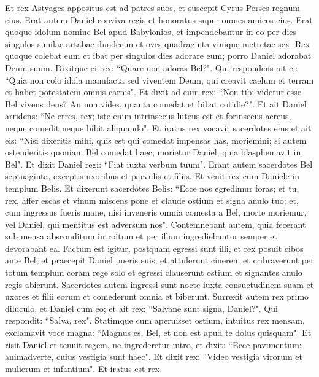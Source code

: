 \begin{biblechapter}  
\verse Et rex Astyages appositus est ad patres suos, et suscepit Cyrus Perses regnum eius. 
\verse Erat autem Daniel conviva regis et honoratus super omnes amicos eius. 
\verse Erat quoque idolum nomine Bel apud Babylonios, ct impendebantur in eo per dies singulos similae artabae duodecim et oves quadraginta vinique metretae sex.  
\verse Rex quoque colebat eum et ibat per singulos dies adorare eum; porro Daniel adorabat Deum suum. Dixitque ei rex: “Quare non adoras Bel?". 
\verse Qui respondens ait ei: “Quia non colo idola manufacta sed viventem Deum, qui creavit caelum et terram et habet potestatem omnis carnis". 
\verse Et dixit ad eum rex: “Non tibi videtur esse Bel vivens deus? An non vides, quanta comedat et bibat cotidie?". 
\verse Et ait Daniel arridens: “Ne erres, rex; iste enim intrinsecus luteus est et forinsecus aereus, neque comedit neque bibit aliquando". 
\verse Et iratus rex vocavit sacerdotes eius et ait eis: “Nisi dixeritis mihi, quis est qui comedat impensas has, moriemini; 
\verse si autem ostenderitis quoniam Bel comedat haec, morietur Daniel, quia blasphemavit in Bel". Et dixit Daniel regi: “Fiat iuxta verbum tuum". 
\verse Erant autem sacerdotes Bel septuaginta, exceptis uxoribus et parvulis et filiis. Et venit rex cum Daniele in templum Belis. 
\verse Et dixerunt sacerdotes Belis: “Ecce nos egredimur foras; et tu, rex, affer escas et vinum miscens pone et claude ostium et signa anulo tuo; 
\verse et, cum ingressus fueris mane, nisi inveneris omnia comesta a Bel, morte moriemur, vel Daniel, qui mentitus est adversum nos". 
\verse Contemnebant autem, quia fecerant sub mensa absconditum introitum et per illum ingrediebantur semper et devorabant ea. 
\verse Factum est igitur, postquam egressi sunt illi, et rex posuit cibos ante Bel; et praecepit Daniel pueris suis, et attulerunt cinerem et cribraverunt per totum templum coram rege solo et egressi clauserunt ostium et signantes anulo regis abierunt. 
\verse Sacerdotes autem ingressi sunt nocte iuxta consuetudinem suam et uxores et filii eorum et comederunt omnia et biberunt. 
\verse Surrexit autem rex primo diluculo, et Daniel cum eo; 
\verse et ait rex: “Salvane sunt signa, Daniel?". Qui respondit: “Salva, rex". 
\verse Statimque cum aperuisset ostium, intuitus rex mensam, exclamavit voce magna: “Magnus es, Bel, et non est apud te dolus quisquam". 
\verse Et risit Daniel et tenuit regem, ne ingrederetur intro, et dixit: “Ecce pavimentum; animadverte, cuius vestigia sunt haec". 
\verse Et dixit rex: “Video vestigia virorum et mulierum et infantium". Et iratus est rex. 

\end{biblechapter}
